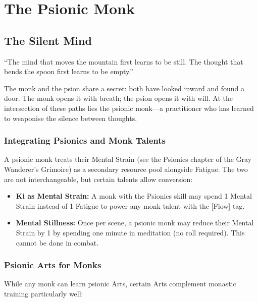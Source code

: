 \documentclass[11pt]{book}
\begin{document}
\part{The Psionic Monk}

\chapter{The Silent Mind}

``The mind that moves the mountain first learns to be still. The thought that bends the spoon first learns to be empty.''

The monk and the psion share a secret: both have looked inward and found a door. The monk opens it with breath; the psion opens it with will. At the intersection of these paths lies the psionic monk---a practitioner who has learned to weaponise the silence between thoughts.

\section{Integrating Psionics and Monk Talents}

A psionic monk treats their Mental Strain (see the Psionics chapter of the Gray Wanderer's Grimoire) as a secondary resource pool alongside Fatigue. The two are not interchangeable, but certain talents allow conversion:

\begin{itemize}
    \item \textbf{Ki as Mental Strain:} A monk with the Psionics skill may spend 1 Mental Strain instead of 1 Fatigue to power any monk talent with the [Flow] tag.
    \item \textbf{Mental Stillness:} Once per scene, a psionic monk may reduce their Mental Strain by 1 by spending one minute in meditation (no roll required). This cannot be done in combat.
\end{itemize}

\section{Psionic Arts for Monks}

While any monk can learn psionic Arts, certain Arts complement monastic training particularly well:
\end{document}
